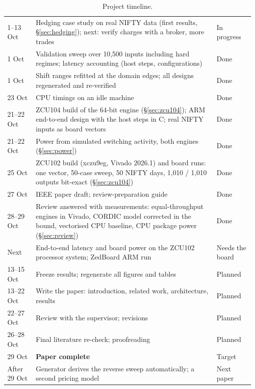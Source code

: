 \documentclass[11pt,a4paper]{article}
\newcommand{\hi}{\rowcolor{accentsoft}}
\begin{document}
\begin{table}[H]
\begin{tabularx}{\textwidth}{@{}l Y l@{}}
1--13 Oct & Hedging case study on real NIFTY data (first results, \S\ref{sec:hedging}); next: verify charges with a broker, more trades & In progress\\
1 Oct & Validation sweep over 10,500 inputs including hard regimes; latency accounting (host steps, configurations) & Done\\
1 Oct & Shift ranges refitted at the domain edges; all designs regenerated and re-verified & Done\\
23 Oct & CPU timings on an idle machine & Done\\
21--22 Oct & ZCU104 build of the 64-bit engine (\S\ref{sec:zcu104}); ARM end-to-end design with the host steps in C; real NIFTY inputs as board vectors & Done\\
21--22 Oct & Power from simulated switching activity, both engines (\S\ref{sec:power}) & Done\\
25 Oct & ZCU102 build (xczu9eg, Vivado 2026.1) and board runs: one vector, 50-case sweep, 50 NIFTY days, 1,010 / 1,010 outputs bit-exact (\S\ref{sec:zcu104}) & Done\\
27 Oct & IEEE paper draft; review-preparation guide & Done\\
28--29 Oct & Review answered with measurements: equal-throughput engines in Vivado, CORDIC model corrected in the bound, vectorised CPU baseline, CPU package power (\S\ref{sec:review}) & Done\\
Next & End-to-end latency and board power on the ZCU102 processor system; ZedBoard ARM run & Needs the board\\

13--15 Oct & Freeze results; regenerate all figures and tables & Planned\\
13--22 Oct & Write the paper: introduction, related work, architecture, results & Planned\\
22--27 Oct & Review with the supervisor; revisions & Planned\\
26--28 Oct & Final literature re-check; proofreading & Planned\\
\hi 29 Oct & \textbf{Paper complete} & Target\\
After 29 Oct & Generator derives the reverse sweep automatically; a second pricing model & Next paper\\
\bottomrule
\end{tabularx}
\caption{Project timeline.}
\label{tab:timeline}
\end{table}
\end{document}
